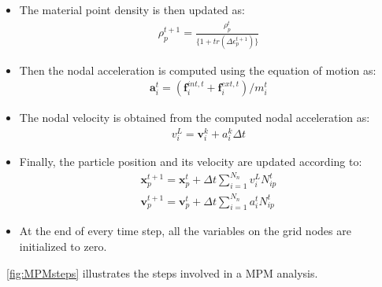 \begin{itemize}
\item
The material point density is then updated as:
\begin{align}
\rho_{p}^{t+1}=\frac{\rho_{p}^{t}}{\{1+tr(\Delta \epsilon_{p}^{t+1})\}}
\end{align}
\item
Then the nodal acceleration is computed using the equation of motion as:
\begin{align}
\mathbf{a}_{\mathit{i}}^{\mathit{t}} = 
(\mathbf{f}_{\mathit{i}}^{\mathit{int,t}} + 
\mathbf{f}_{\mathit{i}}^{\mathit{ext,t}}) / \mathit{m}_{\mathit{i}}^{\mathit{t}}
\end{align}
\item
The nodal velocity is obtained from the computed nodal acceleration as:
\begin{align}
\mathbf{\mathit{v}}_{\mathit{i}}^{L} = 
\mathit{\mathbf{v}}_{\mathit{i}}^{\mathit{k}} + 
\mathbf{\mathit{a}}_{\mathit{i}}^{\mathit{k}} \Delta \mathit{t}
\end{align}
\item
Finally, the particle position and its velocity are updated according to:
\begin{align}
\nonumber
\mathbf{x}_{\mathit{p}}^{\mathit{t}+1} = \mathbf{x}_{\mathit{p}}^{\mathit{t}} + 
\Delta \mathit{t} \sum\limits_{\mathit{i}=1}^{\mathit{N}_{n}} 
\mathbf{\mathit{v}}_{\mathit{i}}^{L}\mathit{N}_{\mathit{ip}}^{\mathit{t}} \\
\mathbf{v}_{\mathit{p}}^{\mathit{t}+1} = \mathbf{v}_{\mathit{p}}^{\mathit{t}} + 
\Delta \mathit{t} \sum\limits_{\mathit{i}=1}^{\mathit{N}_{n}} 
\mathbf{\mathit{a}}_{\mathit{i}}^{t}\mathit{N}_{\mathit{ip}}^{\mathit{t}} 
\end{align}
\item
At the end of every time step, all the variables on the grid nodes are 
initialized to zero.
\end{itemize}
~\cref{fig:MPMsteps} illustrates the steps involved in a MPM analysis. 

